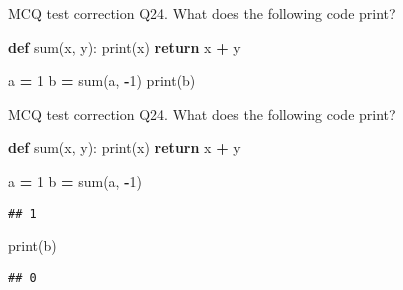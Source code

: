 \documentclass[
  8pt,
  ignorenonframetext,
]{beamer}
\newenvironment{Shaded}{\begin{snugshade}}{\end{snugshade}}
\newcommand{\BuiltInTok}[1]{#1}
\newcommand{\ControlFlowTok}[1]{\textcolor[rgb]{0.13,0.29,0.53}{\textbf{#1}}}
\newcommand{\DecValTok}[1]{\textcolor[rgb]{0.00,0.00,0.81}{#1}}
\newcommand{\KeywordTok}[1]{\textcolor[rgb]{0.13,0.29,0.53}{\textbf{#1}}}
\newcommand{\NormalTok}[1]{#1}
\newcommand{\OperatorTok}[1]{\textcolor[rgb]{0.81,0.36,0.00}{\textbf{#1}}}
\begin{document}
\begin{frame}[fragile]{MCQ test correction}
\protect\hypertarget{mcq-test-correction-46}{}
Q24. What does the following code print?

\begin{Shaded}
\begin{Highlighting}[]
\KeywordTok{def} \BuiltInTok{sum}\NormalTok{(x, y):}
    \BuiltInTok{print}\NormalTok{(x)}
    \ControlFlowTok{return}\NormalTok{ x }\OperatorTok{+}\NormalTok{ y}

\NormalTok{a }\OperatorTok{=} \DecValTok{1}
\NormalTok{b }\OperatorTok{=} \BuiltInTok{sum}\NormalTok{(a, }\OperatorTok{{-}}\DecValTok{1}\NormalTok{)}
\BuiltInTok{print}\NormalTok{(b)}
\end{Highlighting}
\end{Shaded}
\end{frame}

\begin{frame}[fragile]{MCQ test correction}
\protect\hypertarget{mcq-test-correction-47}{}
Q24. What does the following code print?

\begin{Shaded}
\begin{Highlighting}[]
\KeywordTok{def} \BuiltInTok{sum}\NormalTok{(x, y):}
    \BuiltInTok{print}\NormalTok{(x)}
    \ControlFlowTok{return}\NormalTok{ x }\OperatorTok{+}\NormalTok{ y}

\NormalTok{a }\OperatorTok{=} \DecValTok{1}
\NormalTok{b }\OperatorTok{=} \BuiltInTok{sum}\NormalTok{(a, }\OperatorTok{{-}}\DecValTok{1}\NormalTok{)}
\end{Highlighting}
\end{Shaded}

\begin{verbatim}
## 1
\end{verbatim}

\begin{Shaded}
\begin{Highlighting}[]
\BuiltInTok{print}\NormalTok{(b)}
\end{Highlighting}
\end{Shaded}

\begin{verbatim}
## 0
\end{verbatim}
\end{frame}
\end{document}
